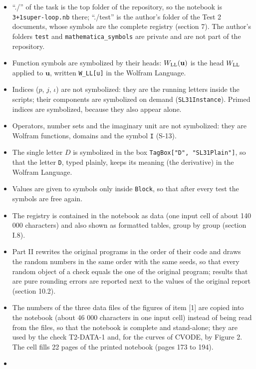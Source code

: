 \documentclass[
  10pt,
]{article}
\begin{document}
\begin{itemize}
\item
  ``./'' of the task is the top folder of the repository, so the
  notebook is \texttt{3+1super-loop.nb} there; ``./test'' is the
  author's folder of the Test 2 documents, whose symbols are the
  complete registry (section 7). The author's folders \texttt{test} and
  \texttt{mathematica\_symbols} are private and are not part of the
  repository.
\item
  Function symbols are symbolized by their heads:
  \(W_{\rm LL}(\mathbf u)\) is the head \(W_{\rm LL}\) applied to
  \(\mathbf u\), written \texttt{W\_LL{[}u{]}} in the Wolfram Language.
\item
  Indices (\(p\), \(j\), \(\iota\)) are not symbolized: they are the
  running letters inside the scripts; their components are symbolized on
  demand (\texttt{SL31Instance}). Primed indices are symbolized, because
  they also appear alone.
\item
  Operators, number sets and the imaginary unit are not symbolized: they
  are Wolfram functions, domains and the symbol \texttt{I} (S-13).
\item
  The single letter \(D\) is symbolized in the box
  \texttt{TagBox{[}"D",\ "SL31Plain"{]}}, so that the letter \texttt{D},
  typed plainly, keeps its meaning (the derivative) in the Wolfram
  Language.
\item
  Values are given to symbols only inside \texttt{Block}, so that after
  every test the symbols are free again.
\item
  The registry is contained in the notebook as data (one input cell of
  about 140 000 characters) and also shown as formatted tables, group by
  group (section I.8).
\item
  Part II rewrites the original programs in the order of their code and
  draws the random numbers in the same order with the same seeds, so
  that every random object of a check equals the one of the original
  program; results that are pure rounding errors are reported next to
  the values of the original report (section 10.2).
\item
  The numbers of the three data files of the figures of item {[}1{]} are
  copied into the notebook (about 46 000 characters in one input cell)
  instead of being read from the files, so that the notebook is complete
  and stand-alone; they are used by the check T2-DATA-1 and, for the
  curves of CVODE, by Figure 2. The cell fills 22 pages of the printed
  notebook (pages 173 to 194).
\item

\end{itemize}
\end{document}
